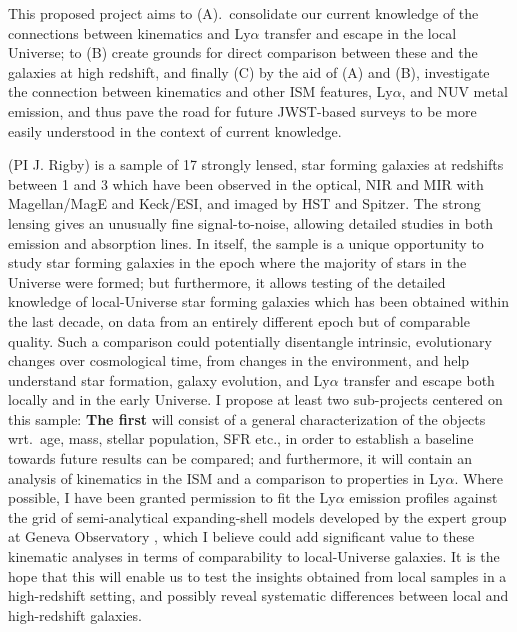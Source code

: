 \documentclass[10pt, letterpaper, headings=Large, DIV=14]{scrartcl}
\begin{document}
This proposed project aims to (A).\ consolidate our
current knowledge of the connections between kinematics and Ly$\alpha$ transfer
and escape in the local Universe; to (B) create grounds for direct comparison
between these and the galaxies at high redshift, and finally (C) by the aid of
(A) and (B), investigate the connection between kinematics and other ISM
features, Ly$\alpha$, and NUV metal emission, and thus pave the road for
future JWST-based surveys to be more easily understood in the context of current
knowledge. \newline




 (PI J. Rigby) is a sample of 17 strongly lensed, star
forming galaxies at redshifts between 1 and 3 which have been observed in the
optical, NIR and MIR with Magellan/MagE and Keck/ESI, and imaged by HST and
Spitzer.  The strong lensing gives an unusually fine signal-to-noise, allowing detailed
studies in both emission and absorption lines. In itself, the sample is a unique
opportunity to study star forming galaxies in the epoch where the majority of
stars in the Universe were formed; but furthermore, it allows testing of the
detailed knowledge of local-Universe star forming galaxies which has
been obtained within the last decade, on data from an entirely different epoch
but of comparable quality. Such a comparison could potentially disentangle
intrinsic, evolutionary changes over cosmological time, from changes in the
environment, and help understand star formation, galaxy evolution, and
Ly$\alpha$ transfer and escape both locally and in the early Universe.
I propose at least two sub-projects centered on this sample: \textbf{The first}
will consist of a general characterization of the objects wrt.\ age, mass,
stellar population, SFR etc., in order to establish a baseline towards future
results can be compared; and furthermore, it will contain an analysis of
kinematics in the ISM and a comparison to properties in Ly$\alpha$. 
Where possible, I have been granted permission to fit the Ly$\alpha$ emission
profiles against the grid of semi-analytical expanding-shell models developed by
the expert group at Geneva Observatory \citep{Scharer2011}, which I believe
could add significant value to these kinematic analyses in terms of
comparability to local-Universe galaxies. It is the hope that this will enable
us to test the insights obtained from local samples in a high-redshift setting,
and possibly reveal systematic differences between local and high-redshift galaxies.
\end{document}
